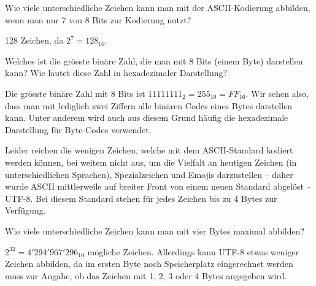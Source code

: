 \begin{myexercise}
	Wie viele unterschiedliche Zeichen kann man mit der \gls{ASCII}-Kodierung abbilden, wenn man nur 7 von 8 Bits zur Kodierung nutzt?
	\begin{myanswer}
		128 Zeichen, da $2^7=128_{10}$.
	\end{myanswer}
\end{myexercise}
\begin{myexercise}
	Welches ist die grösste binäre Zahl, die man mit 8 Bits (einem Byte) darstellen kann? Wie lautet diese Zahl in hexadezimaler Darstellung?
	\begin{myanswer}
		Die grösste binäre Zahl mit 8 Bits ist $11111111_2 = 255_{10} = FF_{16}$. Wir sehen also, dass man mit lediglich zwei Ziffern alle binären Codes eines Bytes darstellen kann. Unter anderem wird auch aus diesem Grund häufig die hexadezimale Darstellung für Byte-Codes verwendet.
	\end{myanswer}
\end{myexercise}

Leider reichen die wenigen Zeichen, welche mit dem \gls{ASCII}-Standard kodiert werden können, bei weitem nicht aus, um die Vielfalt an heutigen Zeichen (in unterschiedlichen Sprachen), Spezialzeichen und Emojis darzustellen -- daher wurde \gls{ASCII} mittlerweile auf breiter Front von einem neuen Standard abgelöst -- \gls{UTF-8}. Bei diesem Standard stehen für jedes Zeichen bis zu 4 Bytes zur Verfügung.
\begin{myexercise}
	Wie viele unterschiedliche Zeichen kann man mit vier Bytes maximal abbilden?
	\begin{myanswer}
		$2^{32}=4'294'967'296_{10}$ mögliche Zeichen. Allerdings kann \gls{UTF-8} etwas weniger Zeichen abbilden, da im ersten Byte noch Speicherplatz eingerechnet werden muss zur Angabe, ob das Zeichen mit 1, 2, 3 oder 4 Bytes angegeben wird.
	\end{myanswer}
\end{myexercise}


\clearpage


